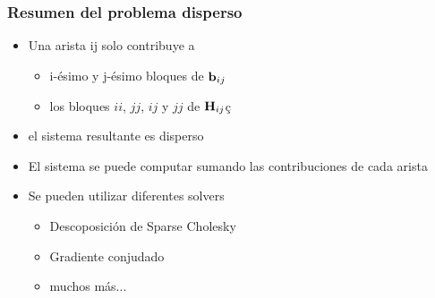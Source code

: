 \begin{frame}
	\frametitle{Resumen del problema disperso}
	
	\begin{itemize}
		\item Una arista ij solo contribuye a
		\begin{itemize}
			\item i-ésimo y j-ésimo bloques de $\boldsymbol{\mathbf{b}}_{ij}$
			\item los bloques $ii$, $jj$, $ij$ y $jj$ de $\boldsymbol{\mathbf{H}}_{ij}$ç
		\end{itemize}
		\item el sistema resultante es disperso
		\item El sistema se puede computar sumando las contribuciones de cada arista
		\item Se pueden utilizar diferentes solvers
		\begin{itemize}
			\item Descoposición de Sparse Cholesky
			\item Gradiente conjudado
			\item muchos más...
		\end{itemize}

	\end{itemize}
	
	
\end{frame}

